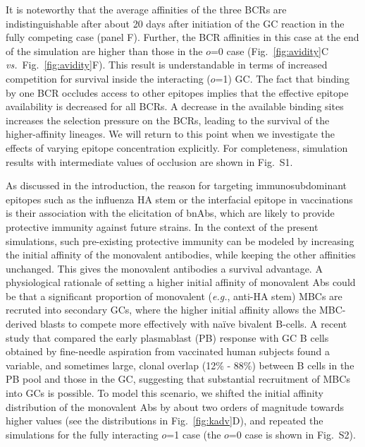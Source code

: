 \documentclass[utf8]{frontiersHLTH}%
\newcommand{\cred}[1]{\textsf{\color{red}#1}}
\def\eg {{\it e.g.}}
\def\vs {{\it vs.}}
\newcommand{\fig}[1]{Fig.~\ref{fig:#1}}
\newcommand{\occl}{o}
\begin{document}
It is noteworthy that the average affinities of the three BCRs are
indistinguishable after about 20 days after initiation of the GC reaction
in the fully competing case (panel F). Further, the BCR affinities in this
case at the end of the
simulation are higher than those in the $\occl$=0 case (\fig{avidity}C
\vs~\fig{avidity}F). This result is understandable in terms of increased
competition for survival inside the interacting ($\occl$=1) GC.  The fact
that binding by one BCR occludes access to other epitopes implies that
the effective epitope availability is decreased for all BCRs. 
A decrease in the available binding sites increases the
selection pressure on the BCRs, leading to the survival of the higher-affinity
lineages. We will return to this point when we investigate
the effects of varying epitope concentration explicitly. 
For completeness, simulation
results with intermediate values of occlusion are shown in Fig.~S1.

As discussed in the introduction, the reason for targeting immunosubdominant
epitopes such as the influenza HA stem or the interfacial
epitope\cite{watanabe19} in vaccinations is their association with the elicitation of bnAbs, which
are likely to provide protective immunity against future strains.
In the context of the present simulations,
such pre-existing protective immunity
can be modeled by increasing the initial affinity of the monovalent
antibodies, while keeping the other affinities unchanged.  This gives the
monovalent antibodies a survival advantage. A physiological
rationale of setting a higher initial affinity of monovalent Abs could
be that a significant proportion of monovalent (\eg, anti-HA stem) MBCs are recruted into secondary
GCs, where the higher initial affinity allows the MBC-derived blasts to compete more effectively with na\"ive bivalent B-cells.
%
\cred{A recent study that compared the early plasmablast (PB) response with GC
B cells obtained by fine-needle aspiration from vaccinated human subjects found a variable, and sometimes large, clonal overlap
(12\% - 88\%) between B cells in the PB pool and those in the GC, suggesting that substantial 
recruitment of MBCs into GCs is possible.\cite{turner20}}
%
To model this scenario, we shifted the initial affinity distribution of the
monovalent Abs
by about two orders of magnitude towards higher values
(see the distributions in \fig{kadv}D), and repeated the simulations for the
fully interacting $\occl$=1 case (the $\occl$=0 case is shown in Fig.~S2).
\end{document}
